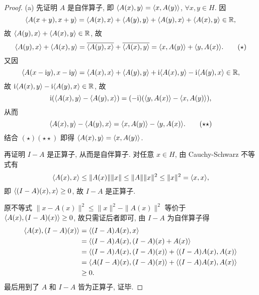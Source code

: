 \begin{proof}
    (a) 先证明 $A$ 是自伴算子, 即 $\langle A(x),y\rangle=\langle x,A(y)\rangle$, $\forall x,y\in H$. 因
    \[\langle A(x+y),x+y\rangle=\langle A(x),x\rangle+\langle A(y),y\rangle+\langle A(y),x\rangle+\langle A(x),y\rangle\in\mathbb{R},\]
    故 $\langle A(y),x\rangle+\langle A(x),y\rangle\in\mathbb{R}$, 故
    \begin{equation}
            \langle A(y),x\rangle+\langle A(x),y\rangle=\overline{\langle A(y),x\rangle}+\overline{\langle A(x),y\rangle}=\langle x,A(y)\rangle+\langle y,A(x)\rangle.\tag{$\star$}
    \end{equation}
    又因
    \[\langle A(x-\mathrm{i} y),x-\mathrm{i} y\rangle=\langle A(x),x\rangle+\langle A(y),y\rangle+\mathrm{i}\langle A(x),y\rangle-\mathrm{i}\langle A(y),x\rangle\in\mathbb{R},\]
    故 $\mathrm{i}\langle A(x),y\rangle-\mathrm{i}\langle A(y),x\rangle\in\mathbb{R}$, 故
    \[\mathrm{i}(\langle A(x),y\rangle-\langle A(y),x\rangle)=(-\mathrm{i})(\langle y,A(x)\rangle-\langle x,A(y)\rangle),\]
    从而
    \begin{equation}
        \langle A(x),y\rangle-\langle A(y),x\rangle=\langle x,A(y)\rangle-\langle y,A(x)\rangle.\tag{$\star\star$}
    \end{equation}
    结合 $(\star)(\star\star)$ 即得 $\langle A(x),y\rangle=\langle x,A(y)\rangle$.

    再证明 $I-A$ 是正算子, 从而是自伴算子. 对任意 $x\in H$, 由 Cauchy-Schwarz 不等式有
    \[\langle A(x),x\rangle\leq\|A(x)\|\|x\|\leq\|A\|\|x\|^2\leq\|x\|^2=\langle x,x\rangle,\]
    即 $\langle(I-A)(x),x\rangle\geq 0$, 故 $I-A$ 是正算子.

    原不等式 $\|x-A(x)\|^2\leq\|x\|^2-\|A(x)\|^2$ 等价于 $\langle A(x),(I-A)(x)\rangle\geq 0$,
    故只需证后者即可, 由 $I-A$ 为自伴算子得
    \begin{align*}
        \langle A(x),(I-A)(x)\rangle
        & =\langle(I-A)A(x),x\rangle \\
        & =\langle(I-A)A(x),(I-A)(x)+A(x)\rangle \\
        & =\langle(I-A)A(x),(I-A)(x)\rangle+\langle(I-A)A(x),A(x)\rangle \\
        & =\langle A(I-A)(x),(I-A)(x)\rangle+\langle(I-A)A(x),A(x)\rangle \\
        & \geq 0.
    \end{align*}
    最后用到了 $A$ 和 $I-A$ 皆为正算子, 证毕.


\end{proof}

